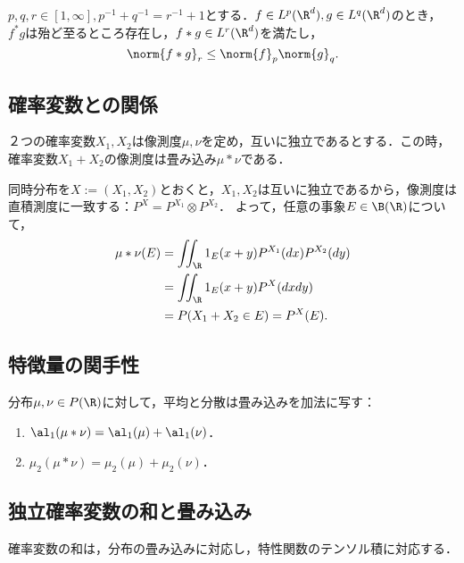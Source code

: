 \documentclass[uplatex,dvipdfmx]{jsreport}
\begin{document}
\begin{proposition}[Young]
    $p,q,r\in[1,\infty],p^{-1}+q^{-1}=r^{-1}+1$とする．$f\in L^p(\R^d),g\in L^q(\R^d)$のとき，$f^*g$は殆ど至るところ存在し，$f*g\in L^r(\R^d)$を満たし，
    \[\norm{f*g}_r\le\norm{f}_p\norm{g}_q.\]
\end{proposition}

\subsection{確率変数との関係}

\begin{proposition}[独立和の分布は畳み込み]
    ２つの確率変数$X_1,X_2$は像測度$\mu,\nu$を定め，互いに独立であるとする．この時，確率変数$X_1+X_2$の像測度は畳み込み$\mu*\nu$である．
\end{proposition}
\begin{Proof}
    同時分布を$X:=(X_1,X_2)$とおくと，$X_1,X_2$は互いに独立であるから，像測度は直積測度に一致する：$P^X=P^{X_1}\otimes P^{X_2}$．
    よって，任意の事象$E\in\B(\R)$について，
    \begin{align*}
        \mu*\nu(E)&=\iint_\R1_E(x+y)P^{X_1}(dx)P^{X_2}(dy)\\
        &=\iint_\R1_E(x+y)P^X(dxdy)\\
        &=P(X_1+X_2\in E)=P^X(E).
    \end{align*}
\end{Proof}

\subsection{特徴量の関手性}

\begin{proposition}
    分布$\mu,\nu\in P(\R)$に対して，平均と分散は畳み込みを加法に写す：
    \begin{enumerate}
        \item $\al_1(\mu*\nu)=\al_1(\mu)+\al_1(\nu)$．
        \item $\mu_2(\mu*\nu)=\mu_2(\mu)+\mu_2(\nu)$．
    \end{enumerate}
\end{proposition}
    

\subsection{独立確率変数の和と畳み込み}

\begin{tcolorbox}[colframe=ForestGreen, colback=ForestGreen!10!white,breakable,colbacktitle=ForestGreen!40!white,coltitle=black,fonttitle=\bfseries\sffamily,
title=]
    確率変数の和は，分布の畳み込みに対応し，特性関数のテンソル積に対応する．
\end{tcolorbox}
\end{document}
